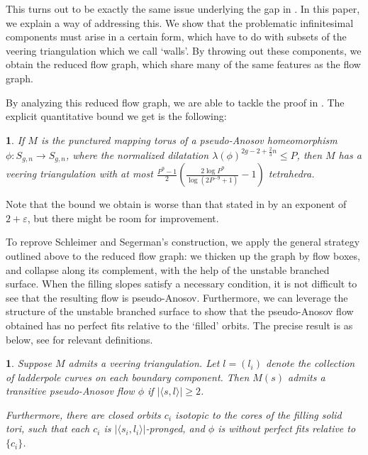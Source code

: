 \documentclass[12pt]{amsart}
\newtheorem*{thm:boundveertet}{\Cref{thm:boundveertet}}
\newtheorem*{thm:vtpAflow}{\Cref{thm:vtpAflow}}
\theoremstyle{definition}
\numberwithin{equation}{section}
\renewcommand{\epsilon}{\varepsilon}
\begin{document}
This turns out to be exactly the same issue underlying the gap in \cite{Ago11}. In this paper, we explain a way of addressing this. We show that the problematic infinitesimal components must arise in a certain form, which have to do with subsets of the veering triangulation which we call `walls'. By throwing out these components, we obtain the reduced flow graph, which share many of the same features as the flow graph.

By analyzing this reduced flow graph, we are able to tackle the proof in \cite{Ago11}. The explicit quantitative bound we get is the following:
\begin{thm:boundveertet}

If $M$ is the punctured mapping torus of a pseudo-Anosov homeomorphism $\phi: S_{g,n} \to S_{g,n}$, where the normalized dilatation $\lambda(\phi)^{2g-2+\frac{2}{3}n} \leq P$, then $M$ has a veering triangulation with at most $\frac{P^9-1}{2} (\frac{2 \log P^9}{\log(2 P^{-9}+1)}-1)$ tetrahedra.
\end{thm:boundveertet}

Note that the bound we obtain is worse than that stated in \cite{Ago11} by an exponent of $2+\epsilon$, but there might be room for improvement.

To reprove Schleimer and Segerman's construction, we apply the general strategy outlined above to the reduced flow graph: we thicken up the graph by flow boxes, and collapse along its complement, with the help of the unstable branched surface. When the filling slopes satisfy a necessary condition, it is not difficult to see that the resulting flow is pseudo-Anosov. Furthermore, we can leverage the structure of the unstable branched surface to show that the pseudo-Anosov flow obtained has no perfect fits relative to the `filled' orbits. The precise result is as below, see  for relevant definitions.

\begin{thm:vtpAflow}
Suppose $M$ admits a veering triangulation. Let $l=(l_i)$ denote the collection of ladderpole curves on each boundary component. Then $M(s)$ admits a transitive pseudo-Anosov flow $\phi$ if $|\langle s,l \rangle| \geq 2$. 

Furthermore, there are closed orbits $c_i$ isotopic to the cores of the filling solid tori, such that each $c_i$ is $|\langle s_i,l_i \rangle|$-pronged, and $\phi$ is without perfect fits relative to $\{c_i\}$.
\end{thm:vtpAflow}
\end{document}
